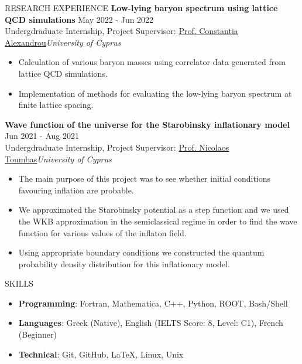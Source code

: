 \documentclass{resume} %
\begin{document}
\begin{rSection}{RESEARCH EXPERIENCE}
                \textbf{Low-lying baryon spectrum using lattice QCD simulations} \hfill May 2022 - Jun 2022\\
                Undergdraduate Internship, Project Supervisor:  \href{https://www.cyi.ac.cy/index.php/castorc/about-the-center/castorc-our-people/itemlist/user/99-constantia-alexandrou.html}{Prof. Constantia Alexandrou}\hfill \textit{University of Cyprus}
                \begin{itemize}
                        \itemsep -3pt {} 
                        \item Calculation of various baryon masses using correlator data generated from lattice QCD simulations.
                        \item Implementation of methods for evaluating the low-lying baryon spectrum at finite lattice spacing.
                \end{itemize}

                \textbf{Wave function of the universe for the Starobinsky inflationary model} \hfill Jun 2021 - Aug 2021\\
                Undergdraduate Internship, Project Supervisor:  \href{https://www.ucy.ac.cy/directory/en/profile/nick}{Prof. Nicolaos Toumbas}\hfill \textit{University of Cyprus}
                \begin{itemize}
                        \itemsep -3pt {} 
                        \item The main purpose of this project was to see whether initial conditions favouring inflation are probable.
                        \item We approximated the Starobinsky potential as a step function and we used the WKB approximation in the semiclassical regime in order to find the wave function for various values of the inflaton field.
                        \item Using appropriate boundary conditions we constructed the quantum probability density distribution for this inflationary model.
                \end{itemize}
        \end{rSection} 

        \bigbreak



        \begin{rSection}{SKILLS}
                \begin{itemize}
                        \itemsep -3pt {} 
                        \item \textbf{Programming}: Fortran, Mathematica, C++, Python, ROOT, Bash/Shell
                        \item \textbf{Languages}: Greek (Native), English (IELTS Score: 8, Level: C1), French (Beginner)
                        \item \textbf{Technical}: Git, GitHub, \LaTeX, Linux, Unix
                \end{itemize}
        \end{rSection}
\end{document}
